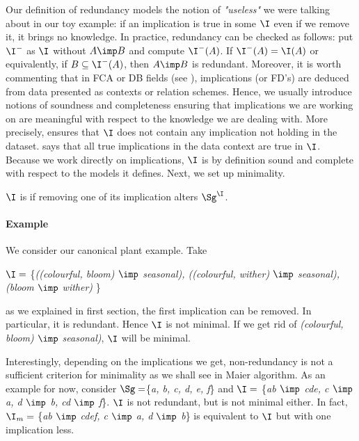 \noindent Our definition of redundancy models the notion of \textit{"useless"} 
we were talking about in our toy example: if an implication is true in some 
$\I$ even if we remove it, it brings no knowledge. In practice, redundancy can 
be checked as follows: put $\I^{-}$ as
$\I$ without $A \imp B$ and compute $\I^{-}(A)$. If $\I^{-}(A) = \I(A)$ or 
equivalently, if $B \subseteq \I^{-}(A)$, then $A \imp B$ is redundant. 
Moreover, it is worth commenting that in FCA or DB fields (see 
\cite{ganter_formal_1999, maier_theory_1983}), implications (or 
FD's) are deduced from data presented as contexts or relation schemes. Hence, 
we usually introduce notions of soundness and completeness ensuring that 
implications we are working on are meaningful with respect to the knowledge we 
are dealing with. More precisely,  ensures that $\I$ does not 
contain any implication not holding in the dataset. 
says that all true implications in the data context are true in $\I$. Because 
we work directly on implications, $\I$ is by definition sound and complete with 
respect to the models it defines. Next, we set up minimality.

\begin{definition}[Minimality] $\I$ is  if removing one of its 
	implication alters $\Sg^{\I}$.
	
\end{definition}

\paragraph{Example} We consider our canonical plant example. Take 

\begin{center}
	$\I = $  \{\textit{((colourful, bloom) $\imp$ seasonal), ((colourful, 
		wither) $\imp$ seasonal), (bloom $\imp$ wither)} \}
\end{center}

\noindent as we explained in first section, the first implication can be 
removed. In particular, it is redundant. Hence $\I$ is not minimal. If 
we get rid of \textit{(colourful, bloom) $\imp$ seasonal)}, $\I$ 
will be minimal.

\vspace{1.2em}

Interestingly, depending on the implications we get, non-redundancy is not a 
sufficient criterion for minimality as we shall see in Maier algorithm. As an 
example for now, consider $\Sg = $\{\textit{a, b, c, d, e, f}\} and $\I = $ 
\{\textit{ab $\imp$ cde, c $\imp$ a, d $\imp$ b, cd $\imp$ f}\}. $\I$ is not 
redundant, but is not minimal either. In fact, $\I_m = $ \{\textit{ab $\imp$ 
cdef, c $\imp$ a, d $\imp$ b}\} is equivalent to $\I$ but with one implication 
less. 

